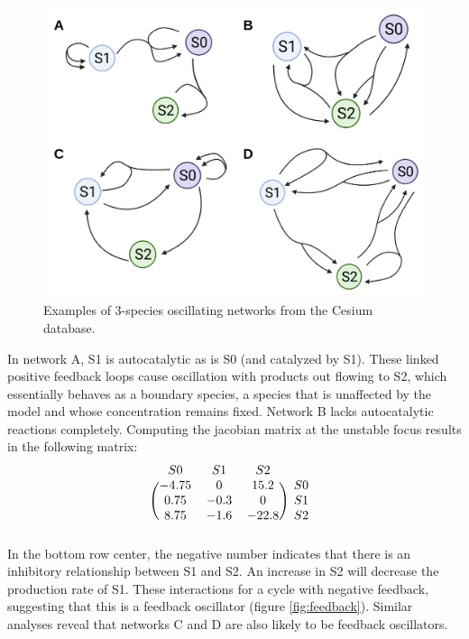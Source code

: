 \documentclass[12pt]{report}
\begin{document}
\begin{figure}
    \centering
    \includegraphics[width=12cm]{images/model-diagrams.png}
    \caption[Examples of evolved oscillating networks]{Examples of 3-species oscillating networks from the Cesium database.}
    \label{fig:model-diagrams}
\end{figure}

In network A, S1 is autocatalytic as is S0 (and catalyzed by S1). These linked positive feedback loops cause oscillation with products out flowing to S2, which essentially behaves as a boundary species, a species that is unaffected by the model and whose concentration remains fixed.  Network B lacks autocatalytic reactions completely. Computing the jacobian matrix at the unstable focus results in the following matrix:
\[
\begin{blockarray}{cccc}
S0 & S1 & S2 \\
\begin{block}{(ccc)c}
  -4.75 & 0 & 15.2 & S0 \\
  0.75 & -0.3 & 0 & S1 \\
  8.75 & -1.6 & -22.8 & S2 \\
\end{block}
\end{blockarray}
 \]
In the bottom row center, the negative number indicates that there is an inhibitory relationship between S1 and S2. An increase in S2 will decrease the production rate of S1. These interactions for a cycle with negative feedback, suggesting that this is a feedback oscillator (figure \ref{fig:feedback}). Similar analyses reveal that networks C and D are also likely to be feedback oscillators.
\end{document}
